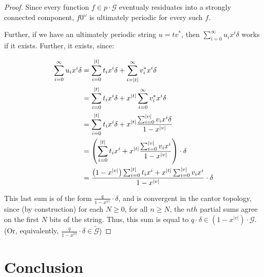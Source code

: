 \documentclass[12pt]{article}
\newcommand{\G}{\mathcal{G}}
\newcommand{\2}{\textbf{2}}
\begin{document}
\begin{proof}
  Since every function $f \in p \cdot \G$ eventualy residuates into a 
  strongly connected component, $f 0^\omega$ is ultimately periodic for
  every such $f$.

  Further, if we have an ultimately periodic string $u = tv^*$, then
  $\sum_{i=0}^{\infty} u_i x^i \delta$ works if it exists. Further,
  it exists, since:

  \begin{align*}
    \sum_{i=0}^{\infty} u_i x^i \delta 
    &= \sum_{i=0}^{|t|} t_i x^i \delta 
        + \sum_{i=|t|}^{\infty} v^*_i x^i \delta\\
    &= \sum_{i=0}^{|t|} t_i x^i \delta 
        + x^{|t|} \sum_{i=0}^{\infty} v^*_i x^i \delta\\
    &= \sum_{i=0}^{|t|} t_i x^i \delta 
         + x^{|t|} \frac{\sum_{i=0}^{|v|} v_i x^i \delta}{1 - x^{|v|}}\\
    &= \left ( 
        \sum_{i=0}^{|t|} t_i x^i
        + x^{|t|} \frac{\sum_{i=0}^{|v|} v_i x^i}{1 - x^{|v|}}
       \right ) \cdot \delta\\
    &= \frac%
        {%
          \left ( 1 - x^{|v|} \right ) \sum_{i=0}^{|t|} t_i x^i + 
          x^{|t|} \sum_{i=0}^{|v|} v_i x^i
        }
        {1 - x^{|v|}}
       \cdot \delta\\
  \end{align*}
   

  This last sum is of the form $\frac{q}{1 - x^{|v|}} \cdot \delta$, 
  and is convergent in the cantor topology, since (by construction)
  for each $N \geq 0$, for all $n \geq N$, the $nth$ partial sums 
  agree on the first $N$ bits of the string.
  Thus, this sum is equal to $q \cdot \delta \in (1 - x^{|v|}) \cdot \G$.
  (Or, equivalently, $\frac{q}{1 - x^{|v|}} \cdot \delta \in \widetilde{\G}$)
\end{proof}

\section{Conclusion}



\end{document}

